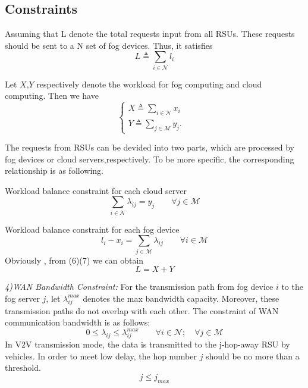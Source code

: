 \documentclass[journal]{IEEEtran}
\begin{document}
\subsection{Constraints}

Assuming that L denote the total requests input from all RSUs. These requests should be sent to a N set of fog devices. Thus, it satisfies 
$$
L \triangleq \sum_{i \in \mathcal{N}} l_i
$$

Let $\mathit{X}$,$\mathit{Y}$ respectively denote the workload for fog computing and cloud computing. Then we have
$$
\left\{
\begin{array}{lr}
\mathit{X} \triangleq \sum_{i \in \mathcal{N}} x_i &  \\
\mathit{Y} \triangleq \sum_{j \in \mathcal{M}} y_j. &
\end{array}
\right.
$$

The requests from RSUs can be devided into two parts, which are processed by fog devices or cloud servers,respectively. To be more specific, the corresponding relationship is as following.

Workload balance constraint for each cloud server
\begin{equation}
\sum_{i \in \mathcal{N}} \lambda_{ij} = y_j \qquad \forall j \in \mathcal{M}
\end{equation}

Workload balance constraint for each fog device
\begin{equation}
l_i - x_i = \sum_{j \in \mathcal{M}} \lambda_{ij} \qquad \forall i \in \mathcal{M}
\end{equation}
Obviously , from (6)(7) we can obtain 
\begin{equation}
L = X+Y
\end{equation}

\textit{4)WAN Bandwidth Constraint:} For the transmission path from fog device $i$ to the fog server $j$, let $\lambda_{ij}^{max}$ denotes the max bandwidth capacity. Moreover, these transmission paths do not overlap with each other. The constraint of WAN communication bandwidth is as follows:
\begin{equation}
0 \leq \lambda_{ij} \leq \lambda_{ij}^{max} \qquad \forall i \in \mathcal{N}; \quad \forall j \in \mathcal{M}
\end{equation}
In V2V transmission mode, the data is transmitted to the j-hop-away RSU by vehicles. In order to meet low delay, the hop number $j$ should be no more than a threshold.
\begin{equation}
j \leqslant j_{max}
\end{equation}
\end{document}
